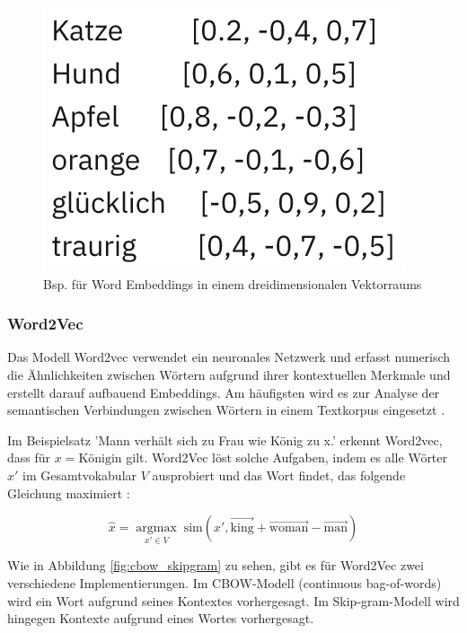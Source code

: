 \begin{figure}[htbp]
    \begin{center}
        \includegraphics[scale=0.6]{static/bsp_word_embeddings.png}
        \caption{\label{fig:bsp_word_embeddings} Bsp. für Word Embeddings in einem dreidimensionalen Vektorraums \cite{ibm2024wordembeddings}}
    \end{center}
\end{figure}

\subsubsection{Word2Vec}
\label{sec:word2vec}

Das Modell Word2vec verwendet ein neuronales Netzwerk und erfasst numerisch die Ähnlichkeiten zwischen Wörtern aufgrund ihrer 
kontextuellen Merkmale und erstellt darauf aufbauend Embeddings. Am häufigsten wird es zur Analyse der semantischen Verbindungen zwischen Wörtern in einem Textkorpus 
eingesetzt \cite{schumacher2024word2vec}.

Im Beispielsatz 'Mann verhält sich zu Frau wie König zu x.' erkennt Word2vec, dass für $x = \text{Königin}$ gilt. 
Word2Vec löst solche Aufgaben, indem es alle Wörter $x'$ im Gesamtvokabular $V$ ausprobiert 
und das Wort findet, das folgende Gleichung maximiert \cite{CHURCH_2017}:

\begin{equation}
    \hat{x} = \underset{x' \in V}{\operatorname{argmax}} \; \text{sim}(x', \vec{\text{king}} + \vec{\text{woman}} - \vec{\text{man}})
\end{equation}

Wie in Abbildung \ref{fig:cbow_skipgram} zu sehen, gibt es für Word2Vec zwei verschiedene Implementierungen.
Im CBOW-Modell (continuous bag-of-words) wird ein Wort aufgrund seines Kontextes vorhergesagt.
Im Skip-gram-Modell wird hingegen Kontexte aufgrund eines Wortes vorhergesagt.

